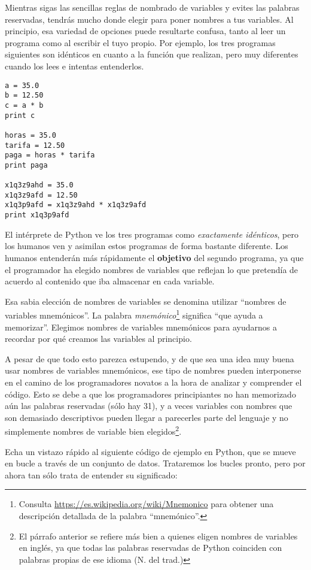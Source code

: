 
Mientras sigas las sencillas reglas de nombrado de variables y evites las
palabras reservadas, tendrás mucho donde elegir para poner nombres a tus variables.
Al principio, esa variedad de opciones puede resultarte confusa, tanto al leer un programa
como al escribir el tuyo propio. Por ejemplo, los tres
programas siguientes son idénticos en cuanto a la función que realizan,
pero muy diferentes cuando los lees e intentas entenderlos.

\beforeverb
\begin{verbatim}
a = 35.0
b = 12.50
c = a * b
print c

horas = 35.0
tarifa = 12.50
paga = horas * tarifa
print paga

x1q3z9ahd = 35.0
x1q3z9afd = 12.50
x1q3p9afd = x1q3z9ahd * x1q3z9afd
print x1q3p9afd
\end{verbatim}
\afterverb
%
El intérprete de Python ve los tres programas como \emph{exactamente idénticos},
pero los humanos ven y asimilan estos programas de forma bastante diferente.
Los humanos entenderán más rápidamente el {\bf objetivo}
del segundo programa, ya que el programador
ha elegido nombres de variables que reflejan lo que pretendía
de acuerdo al contenido que iba almacenar en cada variable.

Esa sabia elección de nombres de variables se denomina utilizar ``nombres de variables mnemónicos''.
La palabra \emph{mnemónico}\footnote{Consulta
\url{https://es.wikipedia.org/wiki/Mnemonico}
para obtener una descripción detallada de la palabra ``mnemónico''.}
significa ``que ayuda a memorizar''.
Elegimos nombres de variables mnemónicos para ayudarnos a recordar por qué creamos las variables
al principio.

A pesar de que todo esto parezca estupendo, y de que sea una idea muy buena usar nombres
de variables mnemónicos, ese tipo de nombres pueden interponerse en el camino de los programadores
novatos a la hora de analizar y comprender el código. Esto se debe a que los programadores
principiantes no han memorizado aún las palabras reservadas (sólo hay 31), y a veces
variables con nombres que son demasiado descriptivos pueden llegar a parecerles
parte del lenguaje y no simplemente nombres de variable bien elegidos\footnote{El párrafo anterior
se refiere más bien a quienes eligen nombres de variables en inglés, ya que todas las
palabras reservadas de Python coinciden con palabras propias de ese idioma (N. del trad.)}.

Echa un vistazo rápido al siguiente código de ejemplo en Python, que se mueve en bucle a través de
un conjunto de datos. Trataremos los bucles pronto, pero por ahora tan sólo trata de entender
su significado:

